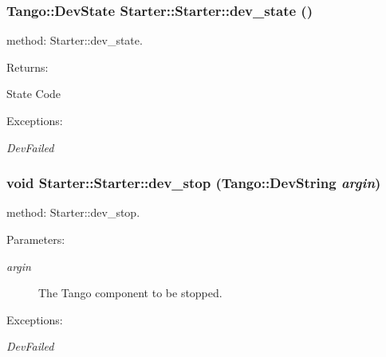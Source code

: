 \subsubsection{\setlength{\rightskip}{0pt plus 5cm}Tango::Dev\-State Starter::Starter::dev\_\-state ()\hspace{0.3cm}{\tt  [virtual]}}\label{classStarter_1_1Starter_z5_0}


method: Starter::dev\_\-state.

\begin{Desc}
\item[Returns: ]\par
State Code \end{Desc}
\begin{Desc}
\item[Exceptions: ]\par
\begin{description}
\item[{\em 
Dev\-Failed}] \end{description}
\end{Desc}
\subsubsection{\setlength{\rightskip}{0pt plus 5cm}void Starter::Starter::dev\_\-stop (Tango::Dev\-String {\em argin})}\label{classStarter_1_1Starter_z5_6}


method: Starter::dev\_\-stop.

\begin{Desc}
\item[Parameters: ]\par
\begin{description}
\item[{\em 
argin}]The Tango component to be stopped. \end{description}
\end{Desc}
\begin{Desc}
\item[Exceptions: ]\par
\begin{description}
\item[{\em 
Dev\-Failed}] \end{description}
\end{Desc}
